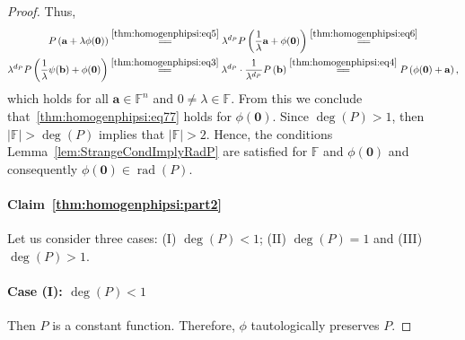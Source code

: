 \documentclass{elsarticle}
\DeclareMathOperator{\rad}{rad}
\def\F{{\mathbb F}}
\theoremstyle{definition}
\numberwithin{equation}{section}
\begin{document}
\begin{proof}
Thus,
\begin{multline*}
P\left(\mathbf a + \lambda \phi (\mathbf 0)\right) \overset{\eqref{thm:homogenphipsi:eq5}}{=\joinrel=}  \lambda^{d_P} P\left(\frac{1}{\lambda}\mathbf a + \phi (\mathbf 0)\right)\overset{\eqref{thm:homogenphipsi:eq6}}{=\joinrel=}\\
\lambda^{d_P} P\left(\frac{1}{\lambda}\psi (\mathbf b) + \phi (\mathbf 0)\right) \overset{\eqref{thm:homogenphipsi:eq3}}{=\joinrel=} \lambda^{d_P} \cdot \frac{1}{\lambda^{d_P}}P\left(\mathbf b\right) \overset{\eqref{thm:homogenphipsi:eq4}}{=\joinrel=} P\left(\phi(\mathbf 0) + \mathbf a\right),
\end{multline*}
which holds for all $\mathbf a \in \F^n$ and $0 \neq \lambda \in \F$. From this we conclude that~\eqref{thm:homogenphipsi:eq77} holds for $\phi(\mathbf 0)$. Since $\deg(P) > 1$, then $|\F| > \deg(P)$ implies that $|\F| > 2$. Hence, the conditions Lemma~\ref{lem:StrangeCondImplyRadP} are satisfied for $\F$ and $\phi(\mathbf 0)$  and consequently $\phi(\mathbf 0) \in \rad(P).$

\paragraph{Claim~\ref{thm:homogenphipsi:part2}}%
Let us consider three cases: (I) $\deg(P) < 1$; (II) $\deg(P) = 1$ and (III) $\deg(P) > 1$.

\paragraph{Case (I): $\deg(P) < 1$} Then $P$ is a constant function. Therefore, $\phi$ tautologically preserves $P$. 


\end{proof}
\end{document}
